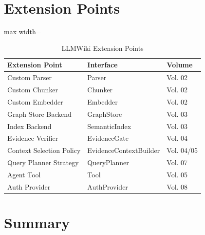 \section{Extension Points}
\label{sec:architecture:extensions}

\begin{table}[htbp]
\centering
\caption{LLMWiki Extension Points}
\label{tab:arch:extensions}
\begin{adjustbox}{max width=\textwidth}
\begin{tabular}{lll}
\toprule
\textbf{Extension Point} & \textbf{Interface} & \textbf{Volume} \\
\midrule
Custom Parser & Parser & Vol. 02 \\
Custom Chunker & Chunker & Vol. 02 \\
Custom Embedder & Embedder & Vol. 02 \\
Graph Store Backend & GraphStore & Vol. 03 \\
Index Backend & SemanticIndex & Vol. 03 \\
Evidence Verifier & EvidenceGate & Vol. 04 \\
Context Selection Policy & EvidenceContextBuilder & Vol. 04/05 \\
Query Planner Strategy & QueryPlanner & Vol. 07 \\
Agent Tool & Tool & Vol. 05 \\
Auth Provider & AuthProvider & Vol. 08 \\
\bottomrule
\end{tabular}
\end{adjustbox}
\end{table}

\section{Summary}
\label{sec:architecture:summary}

